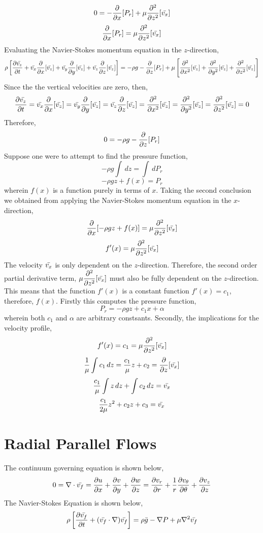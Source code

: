 \documentclass[a4paper, 12pt]{report}
\begin{document}
\begin{center}
$$0 = - \frac{\partial}{\partial x}[P_r] + \mu\frac{\partial^2}{\partial z^2}[\bar{v_x}]$$
$$\frac{\partial}{\partial x}[P_r] =  \mu\frac{\partial^2}{\partial z^2}[\bar{v_x}]$$
Evaluating the Navier-Stokes momentum equation in the $z$-direction,
$$\rho\left[\frac{\partial\bar{v_z}}{\partial t} + \bar{v_x}\frac{\partial}{\partial x}[\bar{v_z}] + \bar{v_y}\frac{\partial}{\partial y}[\bar{v_z}] + \bar{v_z}\frac{\partial}{\partial z}[\bar{v_z}]\right] = -\rho g - \frac{\partial}{\partial z}[P_r] + \mu\left[\frac{\partial^2}{\partial x^2}[\bar{v_z}] + \frac{\partial^2}{\partial y^2}[\bar{v_z}] + \frac{\partial^2}{\partial z^2}[\bar{v_z}]\right]$$
Since the the vertical velocities are zero, then,
$$\frac{\partial\bar{v_z}}{\partial t} = \bar{v_x}\frac{\partial}{\partial x}[\bar{v_z}] = \bar{v_y}\frac{\partial}{\partial y}[\bar{v_z}] = \bar{v_z}\frac{\partial}{\partial z}[\bar{v_z}] = \frac{\partial^2}{\partial x^2}[\bar{v_z}] = \frac{\partial^2}{\partial y^2}[\bar{v_z}] = \frac{\partial^2}{\partial z^2}[\bar{v_z}] = 0$$
Therefore,
$$0 = -\rho g - \frac{\partial}{\partial z}[P_r]$$
Suppose one were to attempt to find the pressure function,
$$-\rho g \int\,dz = \int \,dP_r$$
$$-\rho g z + f(x) = P_r$$
wherein $f(x)$ is a function purely in terms of $x$. Taking the second conclusion we obtained from applying the Navier-Stokes momentum equation in the $x$-direction,
$$\frac{\partial}{\partial x}[-\rho g z + f(x)] =  \mu\frac{\partial^2}{\partial z^2}[\bar{v_x}]$$
$$f'(x) =  \mu\frac{\partial^2}{\partial z^2}[\bar{v_x}]$$
The velocity $\bar{v_x}$ is only dependent on the $z$-direction. Therefore, the second order partial derivative term, $\displaystyle{\mu\frac{\partial^2}{\partial z^2}[\bar{v_x}]}$ must also be fully dependent on the $z$-direction. This means that the function $f'(x)$ is a constant function $f'(x) = c_1$, therefore, $f(x)$. Firstly this computes the pressure function,
$$P_r = -\rho g z + c_1 x + \alpha$$ 
wherein both $c_1$ and $\alpha$ are arbitrary constsants. Secondly, the implications for the velocity profile,
$$f'(x) = c_1 = \mu\frac{\partial^2}{\partial z^2}[\bar{v_x}]$$
$$\frac{1}{\mu}\int c_1\,dz = \frac{c_1}{\mu}z + c_2 = \frac{\partial}{\partial z}[\bar{v_x}]$$
$$\frac{c_1}{\mu}\int z\,dz + \int c_2\,dz = \bar{v_x}$$
$$\frac{c_1}{2\mu} z^2 + c_2z +c_3 = \bar{v_x}$$
\section{Radial Parallel Flows}
\begin{comment}
\end{comment}
The continuum governing equation is shown below,
$$0 = \nabla\cdot\bar{v_f} = \frac{\partial u}{\partial x} + \frac{\partial v}{\partial y} + \frac{\partial w}{\partial z} = \frac{\partial v_r}{\partial r} + \frac{1}{r}\frac{\partial v_\theta}{\partial\theta} + \frac{\partial v_z}{\partial z}$$
The Navier-Stokes Equation is shown below,
$$\rho\left[\frac{\partial\bar{v_f}}{\partial t} + (\bar{v_f}\cdot\nabla)\bar{v_f}\right] = \rho \bar{g} - \nabla P + \mu\nabla^2\bar{v_f}$$

\end{center}
\end{document}
